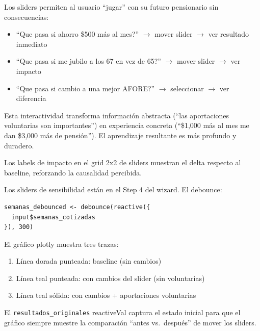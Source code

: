 \documentclass[11pt,a4paper]{report}
\begin{document}
\begin{tcolorbox}[colback=green!5!white, colframe=green!50!black, title=\textbf{Intuici\'on: ``Jugar'' con Tu Pensi\'on}]
Los sliders permiten al usuario ``jugar'' con su futuro pensionario sin consecuencias:
\begin{itemize}
  \item ``Que pasa si ahorro \$500 m\'as al mes?'' $\rightarrow$ mover slider $\rightarrow$ ver resultado inmediato
  \item ``Que pasa si me jubilo a los 67 en vez de 65?'' $\rightarrow$ mover slider $\rightarrow$ ver impacto
  \item ``Que pasa si cambio a una mejor AFORE?'' $\rightarrow$ seleccionar $\rightarrow$ ver diferencia
\end{itemize}

Esta interactividad transforma informaci\'on abstracta (``las aportaciones voluntarias son importantes'') en experiencia concreta (``\$1,000 m\'as al mes me dan \$3,000 m\'as de pensi\'on''). El aprendizaje resultante es m\'as profundo y duradero.

Los labels de impacto en el grid 2x2 de sliders muestran el delta respecto al baseline, reforzando la causalidad percibida.
\end{tcolorbox}

\begin{tcolorbox}[colback=orange!5!white, colframe=orange!75!black, title=\textbf{Aplicaci\'on en C\'odigo}]
Los sliders de sensibilidad est\'an en el Step 4 del wizard. El debounce:
\begin{lstlisting}
semanas_debounced <- debounce(reactive({
  input$semanas_cotizadas
}), 300)
\end{lstlisting}

El gr\'afico plotly muestra tres trazas:
\begin{enumerate}
  \item L\'inea dorada punteada: baseline (sin cambios)
  \item L\'inea teal punteada: con cambios del slider (sin voluntarias)
  \item L\'inea teal s\'olida: con cambios + aportaciones voluntarias
\end{enumerate}

El \texttt{resultados\_originales} reactiveVal captura el estado inicial para que el gr\'afico siempre muestre la comparaci\'on ``antes vs.\ despu\'es'' de mover los sliders.
\end{tcolorbox}
\end{document}

